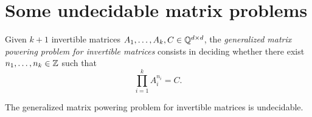\section{Some undecidable matrix problems}

\label{matrix-undecidability}

Given $k+1$ invertible matrices $A_{1}, \ldots, A_{k},C \in \mathbb{Q}^{d \times d}$, the \emph{generalized matrix powering problem for invertible matrices} consists in deciding whether there exist $n_{1}, \ldots, n_{k} \in \mathbb{Z}$ such that
\begin{equation*}
\prod\limits_{i=1}^{k} A_{i}^{n_{i}} = C.
\end{equation*}

\begin{theorem}
The generalized matrix powering problem for invertible matrices is undecidable.
\end{theorem}

